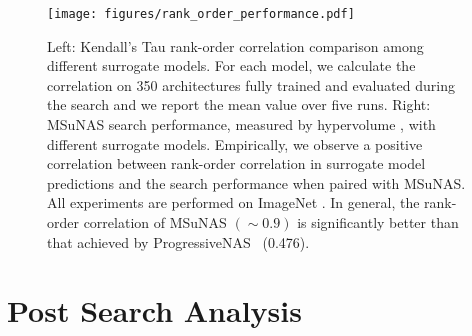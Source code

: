 \documentclass[runningheads]{llncs}
\def\ourmethod{MSuNAS}
\begin{document}
\begin{figure}[!bht]
    \centering
    \texttt{[image: figures/rank\_order\_performance.pdf]}
    \caption{Left: Kendall’s Tau \cite{kendalltau} rank-order correlation comparison among different surrogate models. For each model, we calculate the correlation on 350 architectures fully trained and evaluated during the search and we report the mean value over five runs. Right: \ourmethod{} search performance, measured by hypervolume \cite{hypervolume}, with different surrogate models. Empirically, we observe a positive correlation between rank-order correlation in surrogate model predictions and the search performance when paired with \ourmethod{}. All experiments are performed on ImageNet \cite{imagenet}. In general, the rank-order correlation of \ourmethod{} $(\sim 0.9)$ is significantly better than that achieved by ProgressiveNAS~\cite{PNAS} (0.476).
    \label{fig:rank_order_performance}}
\end{figure}

\section{Post Search Analysis\label{sec:post}}
\end{document}
